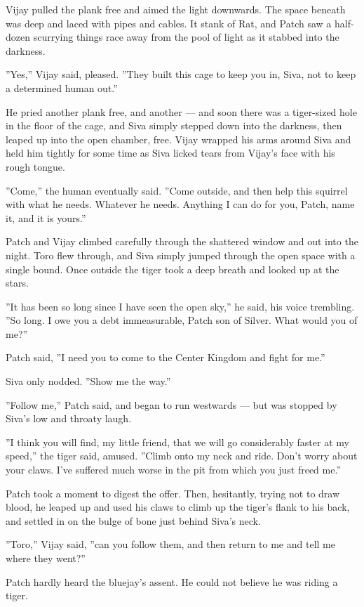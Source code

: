 \documentclass[12pt]{book}
\begin{document}
Vijay pulled the plank free and aimed the light downwards. The space
beneath was deep and laced with pipes and cables. It stank of Rat, and
Patch saw a half-dozen scurrying things race away from the pool of
light as it stabbed into the darkness.

''Yes,'' Vijay said, pleased. ''They built this cage to keep you in,
Siva, not to keep a determined human out.''

He pried another plank free, and another --- and soon there was a
tiger-sized hole in the floor of the cage, and Siva simply stepped
down into the darkness, then leaped up into the open chamber,
free. Vijay wrapped his arms around Siva and held him tightly for some
time as Siva licked tears from Vijay's face with his rough tongue.

''Come,'' the human eventually said. ''Come outside, and then help
this squirrel with what he needs. Whatever he needs. Anything I can do
for you, Patch, name it, and it is yours.''

Patch and Vijay climbed carefully through the shattered window and out
into the night. Toro flew through, and Siva simply jumped through the
open space with a single bound. Once outside the tiger took a deep
breath and looked up at the stars.

''It has been so long since I have seen the open sky,'' he said, his
voice trembling. ''So long. I owe you a debt immeasurable, Patch son
of Silver. What would you of me?''

Patch said, ''I need you to come to the Center Kingdom and fight for
me.''

Siva only nodded. ''Show me the way.''

''Follow me,'' Patch said, and began to run westwards --- but was
stopped by Siva's low and throaty laugh.

''I think you will find, my little friend, that we will go
considerably faster at my speed,'' the tiger said, amused. ''Climb
onto my neck and ride. Don't worry about your claws. I've suffered
much worse in the pit from which you just freed me.''

Patch took a moment to digest the offer. Then, hesitantly, trying not
to draw blood, he leaped up and used his claws to climb up the tiger's
flank to his back, and settled in on the bulge of bone just behind
Siva's neck.

''Toro,'' Vijay said, ''can you follow them, and then return to me and
tell me where they went?''

Patch hardly heard the bluejay's assent. He could not believe he was
riding a tiger.
\end{document}
